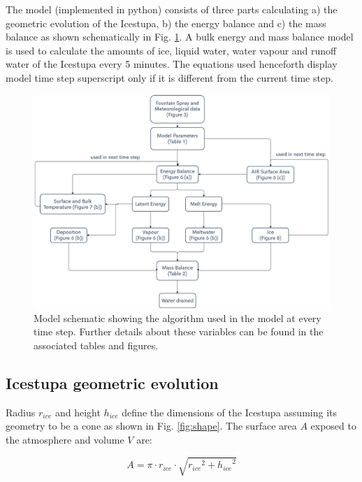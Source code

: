 \documentclass[utf8]{frontiersSCNS} %
\begin{document}
The model (implemented in python) consists of three parts calculating a) the geometric evolution of the Icestupa, b)
the energy balance and c) the mass balance as shown schematically in Fig. \ref{fig:schema}. A bulk energy and mass
balance model is used to calculate the amounts of ice, liquid water, water vapour and runoff water of the Icestupa
every 5 minutes. The equations used henceforth display model time step superscript only if it is different from the
current time step.

  \begin{figure} \begin{center} \includegraphics[width=15 cm]{Figures/Figure_4.jpg} \end{center} \caption{Model
schematic showing the algorithm used in the model at every time step. Further details about these variables can be
found in the associated tables and figures.} \label{fig:schema} \end{figure}

\subsection{Icestupa geometric evolution}

Radius $r_{ice}$ and height $h_{ice}$ define the dimensions of the Icestupa assuming its geometry to be a cone as
shown in Fig. \ref{fig:shape}. The surface area $A$ exposed to the atmosphere and volume $V$ are:

\begin{equation} A = \pi \cdot r_{ice} \cdot \sqrt{{r_{ice}}^2 + {h_{ice}}^ 2} \label{eqn:A} \end{equation}
\end{document}
